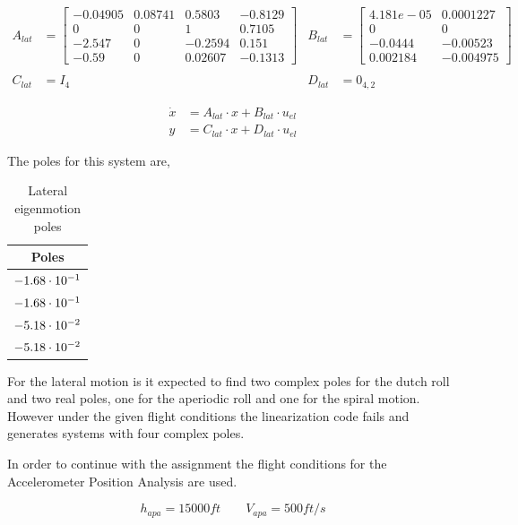 \begin{align*}
    A_{lat}&=\begin{bmatrix}
        -0.04905 & 0.08741 &  0.5803 & -0.8129 \\
               0 &       0 &       1 &  0.7105 \\
          -2.547 &       0 & -0.2594 &   0.151 \\
           -0.59 &       0 & 0.02607 & -0.1313
    \end{bmatrix} &
    B_{lat}&=\begin{bmatrix}
        4.181e-05 & 0.0001227 \\
                0 &         0 \\
          -0.0444 &  -0.00523 \\
         0.002184 & -0.004975 
    \end{bmatrix} \\\\
    C_{lat}&=I_4 &
    D_{lat}&=0_{4,2}
\end{align*}

\begin{align}    
    \dot{x} &= A_{lat} \cdot x + B_{lat} \cdot u_{el} \nonumber\\
    y &= C_{lat} \cdot x + D_{lat} \cdot u_{el} \label{eq:ssaclat}
\end{align}

The poles for this system are,
\begin{table}[h!]
    \centering
    \begin{tabular}{ c }
        Poles \\ \hline \hline
        $-1.68\cdot 10^{-1}$ \\
        $-1.68\cdot 10^{-1}$ \\
        $-5.18\cdot 10^{-2}$ \\
        $-5.18\cdot 10^{-2}$ \\
    \end{tabular}
    \caption{Lateral eigenmotion poles}
\end{table}

For the lateral motion is it expected to find two complex poles for the dutch roll and two real poles, one for the aperiodic roll and one for the spiral motion. However under the given flight conditions the linearization code fails and generates systems with four complex poles.

In order to continue with the assignment the flight conditions for the Accelerometer Position Analysis are used.

\begin{equation*}
    h_{apa} = 15000ft \qquad  V_{apa}=500ft/s
\end{equation*}

